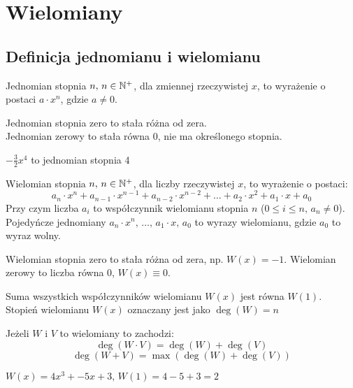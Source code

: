 
\chapter{Wielomiany}
\setcounter{section}{-1}
\section{Definicja jednomianu i wielomianu}

\begin{definition}
  Jednomian stopnia $n, \, n \in \mathbb{N}^+$, dla zmiennej rzeczywistej $x$,
  to wyrażenie o postaci $a \cdot x^n$, gdzie $a \neq 0$.

  Jednomian stopnia zero to stała różna od zera. \\
  Jednomian zerowy to stała równa 0, nie ma określonego stopnia.
\end{definition}

\begin{example} $-\frac{3}{2} x^4$ to jednomian stopnia 4 \end{example}

\begin{definition}
  Wielomian stopnia $n, \, n \in \mathbb{N}^+$, dla liczby rzeczywistej $x$, to wyrażenie o postaci:
  \[
    a_{n} \cdot x^{n} + a_{n - 1} \cdot x^{n - 1} + a_{n - 2} \cdot x^{n - 2} + \dots + a_{2} \cdot x^{2} + a_{1} \cdot x + a_{0}
  \]
  Przy czym liczba $a_i$ to współczynnik wielomianu stopnia $n$ ($0 \leq i \leq n, \, a_n \neq 0$).
  Pojedyńcze jednomiany $a_n \cdot x^n, \, \dots , \, a_1 \cdot x, \, a_0$ to wyrazy wielomianu, gdzie $a_0$ to wyraz wolny.

  Wielomian stopnia zero to stała różna od zera, np. \(W(x) = -1\).
  Wielomian zerowy to liczba równa 0, \(W(x) \equiv 0\).

  Suma wszystkich współczynników wielomianu \(W(x)\) jest równa \(W(1)\). \\
  Stopień wielomianu \(W(x)\) oznaczany jest jako \(\deg\left(W\right) = n\)

  Jeżeli \(W\) i \(V\) to wielomiany to zachodzi:
  \[
    \deg\left(W \cdot V\right) = \deg(W) + \deg(V)
  \]
  \[
    \deg\left(W + V\right) = \max(\deg(W) + \deg(V))
  \]
\end{definition}

\begin{example} $W(x) = 4x^3 + -5x + 3, \, W(1) = 4 - 5 + 3 = 2$ \end{example}

